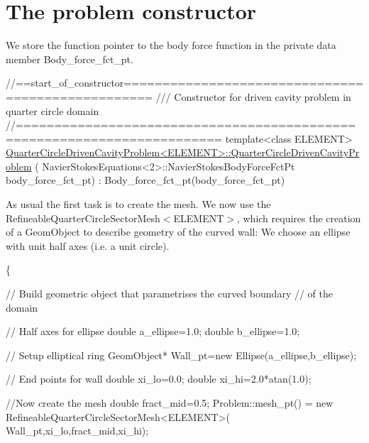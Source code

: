  

\hypertarget{index_constructor}{}\section{The problem constructor}\label{index_constructor}
We store the function pointer to the body force function in the private data member {\ttfamily Body\+\_\+force\+\_\+fct\+\_\+pt}.


\begin{DoxyCodeInclude}
\textcolor{comment}{//==start\_of\_constructor==================================================}
\textcolor{comment}{/// Constructor for driven cavity problem in quarter circle domain}
\textcolor{comment}{}\textcolor{comment}{//========================================================================}
\textcolor{keyword}{template}<\textcolor{keyword}{class} ELEMENT>
\hyperlink{classQuarterCircleDrivenCavityProblem_ae5fd69acf7d28a600cb6aa0bbb6a341c}{QuarterCircleDrivenCavityProblem<ELEMENT>::QuarterCircleDrivenCavityProblem}
      (
 NavierStokesEquations<2>::NavierStokesBodyForceFctPt body\_force\_fct\_pt) :
 Body\_force\_fct\_pt(body\_force\_fct\_pt)

\end{DoxyCodeInclude}


As usual the first task is to create the mesh. We now use the {\ttfamily Refineable\+Quarter\+Circle\+Sector\+Mesh$<$\+E\+L\+E\+M\+E\+N\+T$>$}, which requires the creation of a {\ttfamily Geom\+Object} to describe geometry of the curved wall\+: We choose an ellipse with unit half axes (i.\+e. a unit circle).


\begin{DoxyCodeInclude}
\{ 

 \textcolor{comment}{// Build geometric object that parametrises the curved boundary}
 \textcolor{comment}{// of the domain}

 \textcolor{comment}{// Half axes for ellipse}
 \textcolor{keywordtype}{double} a\_ellipse=1.0;
 \textcolor{keywordtype}{double} b\_ellipse=1.0;

 \textcolor{comment}{// Setup elliptical ring }
 GeomObject* Wall\_pt=\textcolor{keyword}{new} Ellipse(a\_ellipse,b\_ellipse); 

 \textcolor{comment}{// End points for wall}
 \textcolor{keywordtype}{double} xi\_lo=0.0;
 \textcolor{keywordtype}{double} xi\_hi=2.0*atan(1.0);

 \textcolor{comment}{//Now create the mesh}
 \textcolor{keywordtype}{double} fract\_mid=0.5;
 Problem::mesh\_pt() = \textcolor{keyword}{new} 
  RefineableQuarterCircleSectorMesh<ELEMENT>(
   Wall\_pt,xi\_lo,fract\_mid,xi\_hi);

\end{DoxyCodeInclude}


